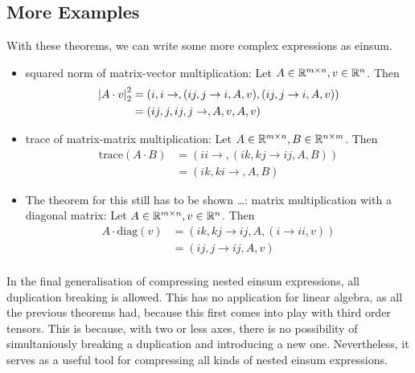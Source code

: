 \subsection{More Examples}
With these theorems, we can write some more complex expressions as einsum.
\begin{itemize}
    \item squared norm of matrix-vector multiplication: Let $A \in \mathbb{R}^{m \times n}, v \in \mathbb{R}^{n}$. Then
          \begin{align*}
              \left| A \cdot v \right|_2^2 & = (i,i\rightarrow,(ij, j \rightarrow i, A, v),(ij, j \rightarrow i, A, v)) \\
                                  & = (ij,j,ij,j\rightarrow,A,v,A,v)
          \end{align*}
    \item trace of matrix-matrix multiplication: Let $A \in \mathbb{R}^{m \times n}, B \in \mathbb{R}^{n \times m}$. Then
          \begin{align*}
              \text{trace}(A \cdot B) & = (ii \rightarrow, (ik, kj \rightarrow ij, A, B)) \\
                                      & = (ik, ki \rightarrow, A, B)
          \end{align*}
    \item The theorem for this still has to be shown \dots:
          matrix multiplication with a diagonal matrix: Let $A \in \mathbb{R}^{m \times n}, v \in \mathbb{R}^{n}$. Then
          \begin{align*}
              A \cdot \text{diag}(v) & = (ik, kj \rightarrow ij, A, (i \rightarrow ii, v)) \\
                                     & = (ij, j \rightarrow ij, A, v)                      \\
          \end{align*}
\end{itemize}

In the final generalisation of compressing nested einsum expressions, all duplication breaking is allowed.
This has no application for linear algebra, as all the previous theorems had, because this first comes into play with third order tensors.
This is because, with two or less axes, there is no possibility of simultaniously breaking a duplication and introducing a new one.
Nevertheless, it serves as a useful tool for compressing all kinds of nested einsum expressions.


